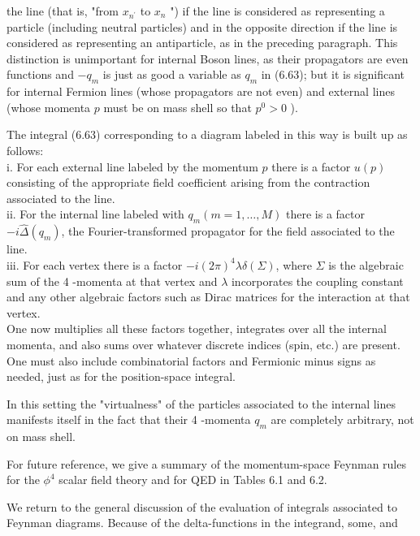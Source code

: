 \documentclass[10pt, letterpaper]{article}
\begin{document}
the line (that is, "from $x_{n^{\prime}}$ to $x_{n}$ ") if the line is considered as representing a particle (including neutral particles) and in the opposite direction if the line is considered as representing an antiparticle, as in the preceding paragraph. This distinction is unimportant for internal Boson lines, as their propagators are even functions and $-q_{m}$ is just as good a variable as $q_{m}$ in (6.63); but it is significant for internal Fermion lines (whose propagators are not even) and external lines (whose momenta $p$ must be on mass shell so that $p^{0}>0$ ).

The integral (6.63) corresponding to a diagram labeled in this way is built up as follows:\\
i. For each external line labeled by the momentum $p$ there is a factor $u(p)$ consisting of the appropriate field coefficient arising from the contraction associated to the line.\\
ii. For the internal line labeled with $q_{m}(m=1, \ldots, M)$ there is a factor $-i \widehat{\Delta}\left(q_{m}\right)$, the Fourier-transformed propagator for the field associated to the line.\\
iii. For each vertex there is a factor $-i(2 \pi)^{4} \lambda \delta(\Sigma)$, where $\Sigma$ is the algebraic sum of the 4 -momenta at that vertex and $\lambda$ incorporates the coupling constant and any other algebraic factors such as Dirac matrices for the interaction at that vertex.\\
One now multiplies all these factors together, integrates over all the internal momenta, and also sums over whatever discrete indices (spin, etc.) are present. One must also include combinatorial factors and Fermionic minus signs as needed, just as for the position-space integral.

In this setting the "virtualness" of the particles associated to the internal lines manifests itself in the fact that their 4 -momenta $q_{m}$ are completely arbitrary, not on mass shell.

For future reference, we give a summary of the momentum-space Feynman rules for the $\phi^{4}$ scalar field theory and for QED in Tables 6.1 and 6.2.

We return to the general discussion of the evaluation of integrals associated to Feynman diagrams. Because of the delta-functions in the integrand, some, and
\end{document}
